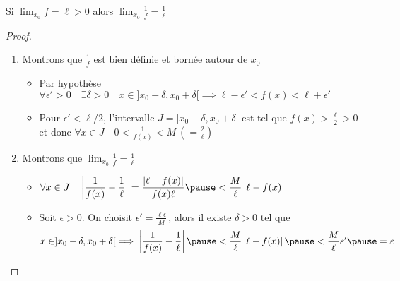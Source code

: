 \begin{frame}

\vspace*{1ex}
\centerline{Si \quad $\displaystyle\lim_{x_0} f=\ell > 0$ \quad  alors \quad $\displaystyle\lim_{x_0} \frac1f = \frac1\ell$}
 
\pause 

\begin{proof} 

\begin{enumerate}
\item Montrons que $\frac 1 f$ est bien définie et bornée autour de $x_0$
  
\pause 

  \begin{itemize}
    \item Par hypothèse 
$\forall \epsilon'>0 \quad \exists \delta>0  \quad x\in ]x_0-\delta,x_0+\delta [
\implies \ell-\epsilon' < f(x) <\ell+\epsilon'$

\pause  

    \item Pour $\epsilon'<\ell/2$, \pause l'intervalle $J = ]x_0-\delta,x_0+\delta [$ \pause est tel que 
    $f(x) > \frac{\ell}{2}>0$ \pause et donc 
$\forall x\in J \quad 0< \frac{1}{f(x)} < M \ (=\frac{2}{\ell})$
  \end{itemize}


\pause 

\item Montrons que $\displaystyle\lim_{x_0} \frac1f = \frac1\ell$ \pause 


  \begin{itemize}
    \item 
$\displaystyle \forall x\in J \quad  \left\vert \frac{1}{f(x)} - \frac1\ell  \right\vert 
= \frac{\left\vert \ell - f(x) \right\vert }{f(x)\ell} \pause < \frac{M}{\ell}\left\vert \ell - f(x) \right\vert  $
 
\pause 
\smallskip

    \item Soit $\epsilon>0$. \pause On choisit $\epsilon'=\frac{\ell \epsilon}{M}$\,, 
    \pause alors il existe $\delta>0$ tel que
    \vspace*{-1ex}
\[x\in ]x_0-\delta,x_0+\delta [
\implies \left\vert \frac{1}{f(x)} - \frac1\ell  \right\vert \pause < \frac{M}{\ell}\left\vert \ell - f(x) \right\vert 
\pause <  \frac{M}{\ell}\epsilon' \pause = \epsilon 
\]
\vspace*{-5ex}
  \end{itemize}
\end{enumerate}
\end{proof}
 
\end{frame}


